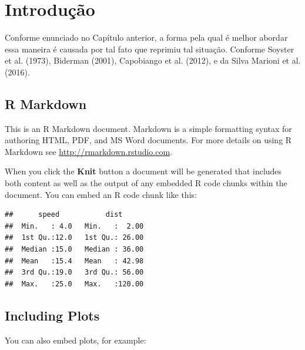 \documentclass[12pt,english, french, spanish, brazil,a4paper,twoside, openright]{abntex2}	%
\begin{document}

\tableofcontents*
\cleardoublepage



\textual	%
\chapter{Introdução}

Conforme enunciado no Capítulo anterior, a forma pela qual é melhor
abordar essa maneira é causada por tal fato que reprimiu tal situação.
Conforme Soyster et al. (1973), Biderman (2001), Capobiango et al.
(2012), e da Silva Marioni et al. (2016).

\hypertarget{r-markdown}{%
\section{R Markdown}\label{r-markdown}}

This is an R Markdown document. Markdown is a simple formatting syntax
for authoring HTML, PDF, and MS Word documents. For more details on
using R Markdown see \url{http://rmarkdown.rstudio.com}.

When you click the \textbf{Knit} button a document will be generated
that includes both content as well as the output of any embedded R code
chunks within the document. You can embed an R code chunk like this:

\begin{verbatim}
##      speed           dist       
##  Min.   : 4.0   Min.   :  2.00  
##  1st Qu.:12.0   1st Qu.: 26.00  
##  Median :15.0   Median : 36.00  
##  Mean   :15.4   Mean   : 42.98  
##  3rd Qu.:19.0   3rd Qu.: 56.00  
##  Max.   :25.0   Max.   :120.00
\end{verbatim}

\hypertarget{including-plots}{%
\section{Including Plots}\label{including-plots}}

You can also embed plots, for example:
\end{document}
